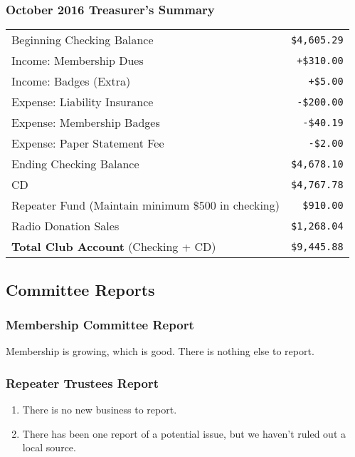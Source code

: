 \documentclass[10pt,letterpaper]{article}
\begin{document}
\subsubsection{October 2016 Treasurer's Summary}
\noindent
\begin{tabular}{|l|r|}
  \hline
  Beginning Checking Balance & \texttt{\$4,605.29} \\
  Income: Membership Dues & \texttt{+\$310.00} \\
  Income: Badges (Extra) & \texttt{+\$5.00} \\
  Expense: Liability Insurance & \texttt{-\$200.00} \\
  Expense: Membership Badges & \texttt{-\$40.19} \\
  Expense: Paper Statement Fee & \texttt{-\$2.00} \\
  Ending Checking Balance & \texttt{\$4,678.10} \\
  \hline
  \hline
  CD & \texttt{\$4,767.78} \\
  \hline
  \hline
  Repeater Fund (Maintain minimum \$500 in checking) & \texttt{\$910.00} \\
  \hline
  \hline
  Radio Donation Sales & \texttt{\$1,268.04} \\
  \hline
  \hline
  \textbf{Total Club Account} (Checking + CD) & \texttt{\$9,445.88} \\
  \hline
\end{tabular}

\subsection{Committee Reports}

\subsubsection{Membership Committee Report}
Membership is growing, which is good. There is nothing else to report.

\subsubsection{Repeater Trustees Report}
\begin{enumerate}
\item There is no new business to report.
\item There has been one report of a potential issue, but we haven't ruled out a local source.
\end{enumerate}
\end{document}
